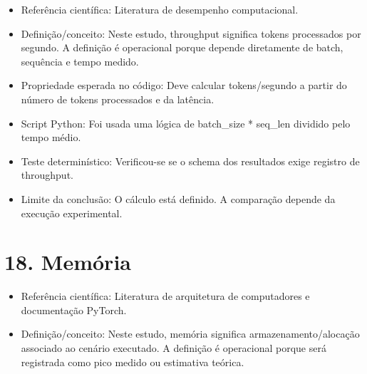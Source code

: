\begin{itemize}
\item Referência científica:
Literatura de desempenho computacional.
\end{itemize}

\begin{itemize}
\item Definição/conceito:
Neste estudo, throughput significa tokens processados por segundo. A definição
é operacional porque depende diretamente de batch, sequência e tempo medido.
\end{itemize}

\begin{itemize}
\item Propriedade esperada no código:
Deve calcular tokens/segundo a partir do número de tokens processados e da
latência.
\end{itemize}

\begin{itemize}
\item Script Python:
Foi usada uma lógica de batch\_\allowbreak{}size * seq\_\allowbreak{}len dividido pelo tempo médio.
\end{itemize}

\begin{itemize}
\item Teste determinístico:
Verificou-se se o schema dos resultados exige registro de throughput.
\end{itemize}

\begin{itemize}
\item Limite da conclusão:
O cálculo está definido. A comparação depende da execução experimental.
\end{itemize}



\section{18. Memória}


\begin{itemize}
\item Referência científica:
Literatura de arquitetura de computadores e documentação PyTorch.
\end{itemize}

\begin{itemize}
\item Definição/conceito:
Neste estudo, memória significa armazenamento/alocação associado ao cenário
executado. A definição é operacional porque será registrada como pico medido ou
estimativa teórica.
\end{itemize}

